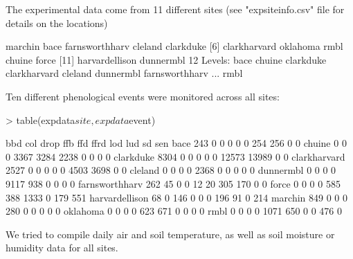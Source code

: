 \documentclass{article}
\begin{document}
The experimental data come from 11 different sites (see "expsiteinfo.csv" file for details on the locations)

\begin{Schunk}
\begin{Soutput}
 [1] marchin        bace           farnsworthharv cleland        clarkduke     
 [6] clarkharvard   oklahoma       rmbl           chuine         force         
[11] harvardellison dunnermbl     
12 Levels: bace chuine clarkduke clarkharvard cleland dunnermbl farnsworthharv ... rmbl
\end{Soutput}
\end{Schunk}

Ten different phenological events were monitored across all sites:
\begin{Schunk}
\begin{Sinput}
> table(expdata$site, expdata$event)
\end{Sinput}
\begin{Soutput}
                   bbd   col  drop   ffb   ffd  ffrd   lod   lud    sd   sen
  bace             243     0     0     0     0     0   254   256     0     0
  chuine             0     0     0  3367  3284  2238     0     0     0     0
  clarkduke       8304     0     0     0     0     0 12573 13989     0     0
  clarkharvard    2527     0     0     0     0     0  4503  3698     0     0
  cleland            0     0     0     0  2368     0     0     0     0     0
  dunnermbl          0     0     0     0  9117   938     0     0     0     0
  farnsworthharv   262    45     0     0    12    20   305   170     0     0
  force              0     0     0     0   585   388  1333     0   179   551
  harvardellison    68     0   146     0     0     0   196    91     0   214
  marchin          849     0     0     0   280     0     0     0     0     0
  oklahoma           0     0     0     0   623   671     0     0     0     0
  rmbl               0     0     0     0  1071   650     0     0   476     0
\end{Soutput}
\end{Schunk}
We tried to compile daily air and soil temperature, as well as soil moisture or humidity data for all sites.
\end{document}
